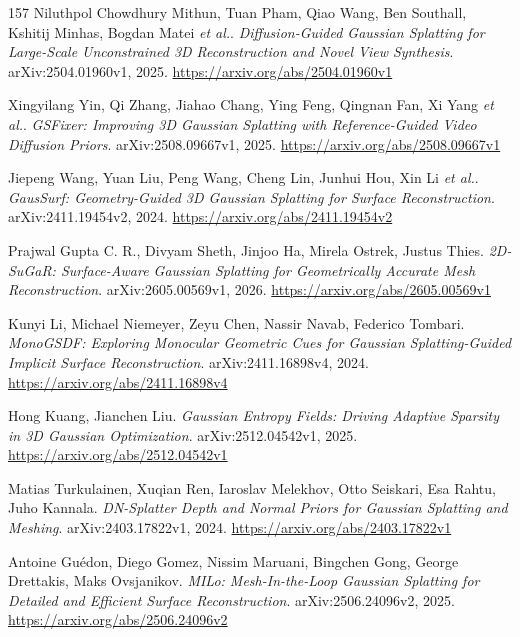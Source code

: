 \documentclass[11pt,a4paper]{article}
\begin{document}
\begin{thebibliography}{157}
Niluthpol Chowdhury Mithun, Tuan Pham, Qiao Wang, Ben Southall, Kshitij Minhas, Bogdan Matei \emph{et al.}.
\newblock \emph{Diffusion-Guided Gaussian Splatting for Large-Scale Unconstrained 3D Reconstruction and Novel View Synthesis}.
\newblock arXiv:2504.01960v1, 2025.
\newblock \url{https://arxiv.org/abs/2504.01960v1}

Xingyilang Yin, Qi Zhang, Jiahao Chang, Ying Feng, Qingnan Fan, Xi Yang \emph{et al.}.
\newblock \emph{GSFixer: Improving 3D Gaussian Splatting with Reference-Guided Video Diffusion Priors}.
\newblock arXiv:2508.09667v1, 2025.
\newblock \url{https://arxiv.org/abs/2508.09667v1}

Jiepeng Wang, Yuan Liu, Peng Wang, Cheng Lin, Junhui Hou, Xin Li \emph{et al.}.
\newblock \emph{GausSurf: Geometry-Guided 3D Gaussian Splatting for Surface Reconstruction}.
\newblock arXiv:2411.19454v2, 2024.
\newblock \url{https://arxiv.org/abs/2411.19454v2}

Prajwal Gupta C. R., Divyam Sheth, Jinjoo Ha, Mirela Ostrek, Justus Thies.
\newblock \emph{2D-SuGaR: Surface-Aware Gaussian Splatting for Geometrically Accurate Mesh Reconstruction}.
\newblock arXiv:2605.00569v1, 2026.
\newblock \url{https://arxiv.org/abs/2605.00569v1}

Kunyi Li, Michael Niemeyer, Zeyu Chen, Nassir Navab, Federico Tombari.
\newblock \emph{MonoGSDF: Exploring Monocular Geometric Cues for Gaussian Splatting-Guided Implicit Surface Reconstruction}.
\newblock arXiv:2411.16898v4, 2024.
\newblock \url{https://arxiv.org/abs/2411.16898v4}

Hong Kuang, Jianchen Liu.
\newblock \emph{Gaussian Entropy Fields: Driving Adaptive Sparsity in 3D Gaussian Optimization}.
\newblock arXiv:2512.04542v1, 2025.
\newblock \url{https://arxiv.org/abs/2512.04542v1}

Matias Turkulainen, Xuqian Ren, Iaroslav Melekhov, Otto Seiskari, Esa Rahtu, Juho Kannala.
\newblock \emph{DN-Splatter Depth and Normal Priors for Gaussian Splatting and Meshing}.
\newblock arXiv:2403.17822v1, 2024.
\newblock \url{https://arxiv.org/abs/2403.17822v1}

Antoine Gu\'{e}don, Diego Gomez, Nissim Maruani, Bingchen Gong, George Drettakis, Maks Ovsjanikov.
\newblock \emph{MILo: Mesh-In-the-Loop Gaussian Splatting for Detailed and Efficient Surface Reconstruction}.
\newblock arXiv:2506.24096v2, 2025.
\newblock \url{https://arxiv.org/abs/2506.24096v2}


\end{thebibliography}
\end{document}
